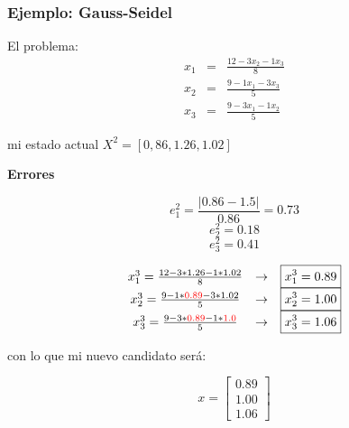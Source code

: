\documentclass[xcolor=svgnames]{beamer} %
\theoremstyle{plain}
\renewcommand{\textbf}[1]{{\bfseries\textcolor{redUnq2}{#1}}}
\theoremstyle{definition}
\begin{document}
\begin{frame}
\frametitle{Ejemplo: Gauss-Seidel}

\begin{minipage}{.4\linewidth}
El problema:\vspace{-5pt}
$$\begin{array}{ccc}
x_1 &=& \frac{12-3x_2-1x_3}{8}\\
x_2 &=& \frac{9-1x_1-3x_3}{5}\\
x_3 &=& \frac{9-3x_1-1x_2}{5}
\end{array}$$

mi estado actual $X^2 =[0,86,1.26,1.02]$\vspace{-5pt}
\end{minipage} \vrule \begin{minipage}{.5\linewidth}
\begin{center}
  \textbf{Errores}
\end{center}$$e_1^2 = \frac{|0.86 -1.5|}{0.86} 	= 0.73$$
$$e_2^2 = 0.18$$
$$e_3^2 = 0.41$$
\end{minipage}



\begin{minipage}{.65\linewidth}
\pause
$$\begin{array}{ccc}
x_1^3 = \frac{12-3*1.26-1*1.02}{8} &\rightarrow & \boxed{x_1^3 = 0.89}\\
x_2^3 = \frac{9-1*{\color{red}0.89}-3*1.02}{5} &\rightarrow & \boxed{x_2^3 = 1.00}\\
x_3^3 = \frac{9-3*{\color{red}0.89}-1*{\color{red}1.0}}{5} &\rightarrow & \boxed{x_3^3 = 1.06}
\end{array}$$

\end{minipage}\pause \vrule \begin{minipage}{.3\linewidth}
con lo que mi nuevo candidato será:

$$x = \begin{bmatrix}
0.89\\
1.00\\
1.06
\end{bmatrix}$$

\end{minipage}
\end{frame}
\end{document}
